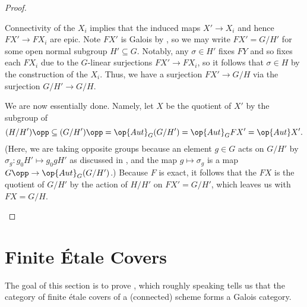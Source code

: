 \documentclass{amsart}
\begin{document}
\begin{proof}
\begin{itemize}
        Connectivity of the $X_i$ implies that the induced maps $X'\to X_i$ and hence $FX'\to FX_i$ are epic. Note $FX'$ is Galois by , so we may write $FX'=G/H'$ for some open normal subgroup $H'\subseteq G$. Notably, any $\sigma\in H'$ fixes $FY$ and so fixes each $FX_i$ due to the $G$-linear surjections $FX'\to FX_i$, so it follows that $\sigma\in H$ by the construction of the $X_i$. Thus, we have a surjection $FX'\to G/H$ via the surjection $G/H'\to G/H$.
    
        We are now essentially done. Namely, let $X$ be the quotient of $X'$ by the subgroup of
        \[(H/H')\opp\subseteq(G/H')\opp=\op{Aut}_G(G/H')=\op{Aut}_GFX'=\op{Aut}X'.\]
        (Here, we are taking opposite groups because an element $g\in G$ acts on $G/H'$ by $\sigma_g\colon g_0H'\mapsto g_0gH'$ as discussed in , and the map $g\mapsto\sigma_g$ is a map $G\opp\to\op{Aut}_G(G/H')$.) Because $F$ is exact, it follows that the $FX$ is the quotient of $G/H'$ by the action of $H/H'$ on $FX'=G/H'$, which leaves us with $FX=G/H$.
        \qedhere
    \end{itemize}
\end{proof}

\section{Finite \'Etale Covers}
The goal of this section is to prove , which roughly speaking tells us that the category of finite \'etale covers of a (connected) scheme forms a Galois category.
\end{document}
